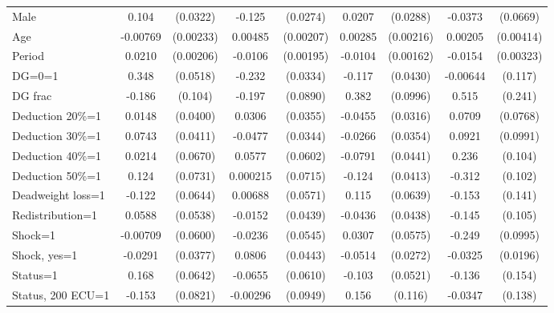 \begin{tabular}{l|cccccc|cc}
Male            &    0.104\sym{***}& (0.0322)&   -0.125\sym{***}& (0.0274)&   0.0207         & (0.0288)&  -0.0373         & (0.0669)\\
Age             & -0.00769\sym{***}&(0.00233)&  0.00485\sym{**} &(0.00207)&  0.00285         &(0.00216)&  0.00205         &(0.00414)\\
Period          &   0.0210\sym{***}&(0.00206)&  -0.0106\sym{***}&(0.00195)&  -0.0104\sym{***}&(0.00162)&  -0.0154\sym{***}&(0.00323)\\
DG=0=1          &    0.348\sym{***}& (0.0518)&   -0.232\sym{***}& (0.0334)&   -0.117\sym{***}& (0.0430)& -0.00644         &  (0.117)\\
DG frac         &   -0.186\sym{*}  &  (0.104)&   -0.197\sym{**} & (0.0890)&    0.382\sym{***}& (0.0996)&    0.515\sym{**} &  (0.241)\\
Deduction 20\%=1&   0.0148         & (0.0400)&   0.0306         & (0.0355)&  -0.0455         & (0.0316)&   0.0709         & (0.0768)\\
Deduction 30\%=1&   0.0743\sym{*}  & (0.0411)&  -0.0477         & (0.0344)&  -0.0266         & (0.0354)&   0.0921         & (0.0991)\\
Deduction 40\%=1&   0.0214         & (0.0670)&   0.0577         & (0.0602)&  -0.0791\sym{*}  & (0.0441)&    0.236\sym{**} &  (0.104)\\
Deduction 50\%=1&    0.124\sym{*}  & (0.0731)& 0.000215         & (0.0715)&   -0.124\sym{***}& (0.0413)&   -0.312\sym{***}&  (0.102)\\
Deadweight loss=1&   -0.122\sym{*}  & (0.0644)&  0.00688         & (0.0571)&    0.115\sym{*}  & (0.0639)&   -0.153         &  (0.141)\\
Redistribution=1&   0.0588         & (0.0538)&  -0.0152         & (0.0439)&  -0.0436         & (0.0438)&   -0.145         &  (0.105)\\
Shock=1         & -0.00709         & (0.0600)&  -0.0236         & (0.0545)&   0.0307         & (0.0575)&   -0.249\sym{**} & (0.0995)\\
Shock, yes=1    &  -0.0291         & (0.0377)&   0.0806\sym{*}  & (0.0443)&  -0.0514\sym{*}  & (0.0272)&  -0.0325         & (0.0196)\\
Status=1        &    0.168\sym{***}& (0.0642)&  -0.0655         & (0.0610)&   -0.103\sym{**} & (0.0521)&   -0.136         &  (0.154)\\
Status, 200 ECU=1&   -0.153\sym{*}  & (0.0821)& -0.00296         & (0.0949)&    0.156         &  (0.116)&  -0.0347         &  (0.138)\\

\end{tabular}
